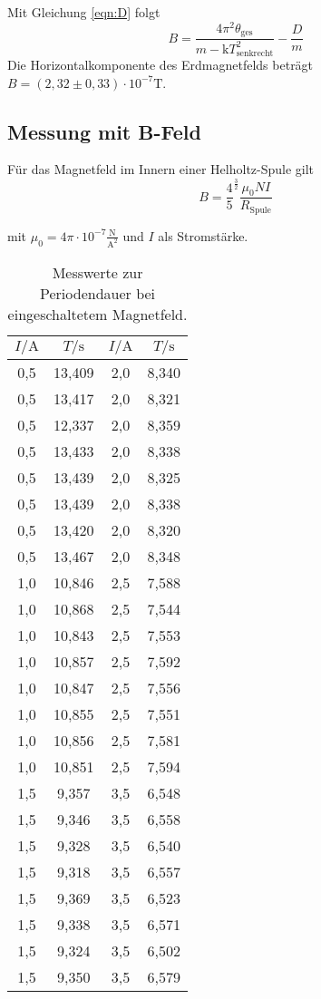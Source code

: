Mit Gleichung \ref{eqn:D} folgt
  \begin{equation}
  B = \frac{4\pi^2 \theta_\mathrm{ges}}{m-\mathrm{k}T_\mathrm{senkrecht}^2} - \frac{D}{m}
\end{equation}
Die Horizontalkomponente des Erdmagnetfelds beträgt $B=(2,32 \pm 0,33)\cdot 10^{-7}\si{\tesla}$.

\subsection{Messung mit B-Feld}

Für das Magnetfeld im Innern einer Helholtz-Spule gilt
\begin{equation}
  B=\frac{4}{5}^{\frac{3}{2}} \frac{\mu_0 N I}{R_\mathrm{Spule}}
\end{equation}

mit $\mu_0=4\pi \cdot 10^{-7} \frac{\si{\newton}}{\si{\ampere}^2}$ und $I$ als Stromstärke.

\begin{table}
  \caption{Messwerte zur Periodendauer bei eingeschaltetem Magnetfeld.}
  \centering
  \label{tab:mag}
  \begin{tabular}{c c | cc}
    \toprule
    $I/ \si{\ampere}$ & $T / \si{\second}$ & $I/ \si{\ampere}$ & $T / \si{\second}$ \\
    \midrule
    0,5 & 13,409 &	2,0 & 8,340 \\
    0,5 & 13,417 &	2,0 & 8,321 \\
    0,5 & 12,337 &	2,0 & 8,359 \\
    0,5 & 13,433 &	2,0 & 8,338 \\
    0,5 & 13,439 &	2,0 & 8,325 \\
    0,5 & 13,439 &	2,0 & 8,338 \\
    0,5 & 13,420 &	2,0 & 8,320 \\
    0,5 & 13,467 &	2,0 & 8,348 \\
    1,0 & 10,846 &	2,5 & 7,588 \\
    1,0 & 10,868 &	2,5 & 7,544 \\
    1,0 & 10,843 &	2,5 & 7,553 \\
    1,0 & 10,857 &	2,5 & 7,592 \\
    1,0 & 10,847 &	2,5 & 7,556 \\
    1,0 & 10,855 &	2,5 & 7,551 \\
    1,0 & 10,856 &	2,5 & 7,581 \\
    1,0 & 10,851 &	2,5 & 7,594 \\
    1,5 & 9,357 &	3,5 & 6,548 \\
    1,5 & 9,346 &	3,5 & 6,558 \\
    1,5 & 9,328 &	3,5 & 6,540 \\
    1,5 & 9,318 &	3,5 & 6,557 \\
    1,5 & 9,369 &	3,5 & 6,523 \\
    1,5 & 9,338 &	3,5 & 6,571 \\
    1,5 & 9,324 &	3,5 & 6,502 \\
    1,5 & 9,350 &	3,5 & 6,579 \\
\bottomrule
\end{tabular}
\end{table}

